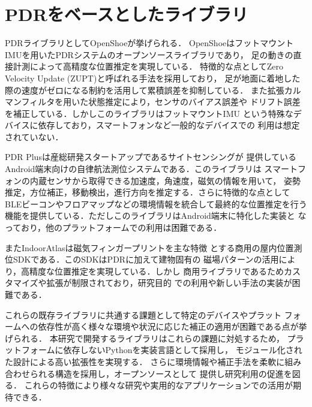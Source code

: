 \section{PDRをベースとしたライブラリ}

PDRライブラリとしてOpenShoe\cite{openshoe}が挙げられる．
OpenShoeはフットマウントIMUを用いたPDRシステムのオープンソースライブラリであり，
足の動きの直接計測によって高精度な位置推定を実現している．
特徴的な点としてZero Velocity Update (ZUPT)と呼ばれる手法を採用しており，
足が地面に着地した際の速度がゼロになる制約を活用して累積誤差を抑制している．
また拡張カルマンフィルタを用いた状態推定により，センサのバイアス誤差や
ドリフト誤差を補正している．しかしこのライブラリはフットマウントIMU
という特殊なデバイスに依存しており，スマートフォンなど一般的なデバイスでの
利用は想定されていない．

PDR Plus\cite{pdr-plus}は産総研発スタートアップであるサイトセンシングが
提供しているAndroid端末向けの自律航法測位システムである．このライブラリは
スマートフォンの内蔵センサから取得できる加速度，角速度，磁気の情報を用いて，
姿勢推定，方位補正，移動検出，進行方向を推定する．さらに特徴的な点として
BLEビーコンやフロアマップなどの環境情報を統合して最終的な位置推定を行う
機能を提供している．ただしこのライブラリはAndroid端末に特化した実装と
なっており，他のプラットフォームでの利用は困難である．

またIndoorAtlas\cite{indoor-atlas}は磁気フィンガープリントを主な特徴
とする商用の屋内位置測位SDKである．このSDKはPDRに加えて建物固有の
磁場パターンの活用により，高精度な位置推定を実現している．しかし
商用ライブラリであるためカスタマイズや拡張が制限されており，研究目的
での利用や新しい手法の実装が困難である．

これらの既存ライブラリに共通する課題として特定のデバイスやプラット
フォームへの依存性が高く様々な環境や状況に応じた補正の適用が困難である点が挙げられる．
本研究で開発するライブラリはこれらの課題に対処するため，
プラットフォームに依存しないPythonを実装言語として採用し，
モジュール化された設計による高い拡張性を実現する．
さらに環境情報や補正手法を柔軟に組み合わせられる構造を採用し，オープンソースとして
提供し研究利用の促進を図る．
これらの特徴により様々な研究や実用的なアプリケーションでの活用が期待できる．




